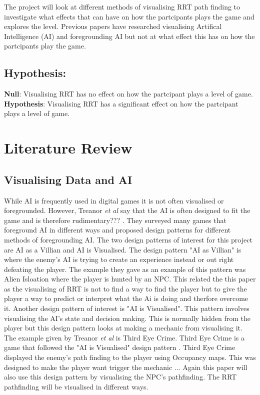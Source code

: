 \documentclass[journal]{IEEEtran}
\begin{document}
The project will look at different methods of visualising RRT path finding to investigate what effects that can have on how the partcipants plays the game and explores the level.  Previous papers have researched visualising Artifical Intelligence (AI) and foregrounding AI but not at what effect this has on how the partcipants play the game.


\subsection{Hypothesis:}
\textbf{Null}: Visualising RRT has no effect on how the partcipant plays a level of game. \\
\textbf{Hypothesis}: Visualising RRT has a significant effect on how the partcipant plays a level of game. 


\section{Literature Review}
\subsection{Visualising Data and AI}
While AI is frequently used in digital games it is not often visualised or foregrounded. However, Treanor \textit{et al} say that the AI is often designed to fit the game and is therefore rudimentary??? \cite{treanor2015}.
They surveyed many games that foreground AI in different ways and proposed design patterns for different methods of foregrounding AI. The two design patterns of interest for this project are AI as a Villian and AI is Visualised. The design pattern "AI as Villian" is where the enemy's AI is trying to create an experience instead or out right defeating the player. The example they gave as an example of this pattern was Alien Isloation where the player is hunted by an NPC.  This related the this paper as the visualising of RRT is not to find a way to find the player but to give the player a way to predict or interpret what the Ai is doing and therfore overcome it.
Another design pattern of interest is "AI is Visualised". This pattern involves visualising the AI's state and decision making. This is normally hidden from the player but this design pattern looks at making a mechanic from visualising it. The example given by Treanor \textit{et al} is Third Eye Crime.  Third Eye Crime is a game that followed the "AI is Visualised" design pattern \cite{Isla2014}.  Third Eye Crime displayed the enemy's path finding to the player using Occupancy maps.  
This was designed to make the player want trigger the mechanic ...  Again this paper will also use this design pattern by visualising the NPC's pathfinding.  The RRT pathfinding will be visualised in different ways.
\end{document}
